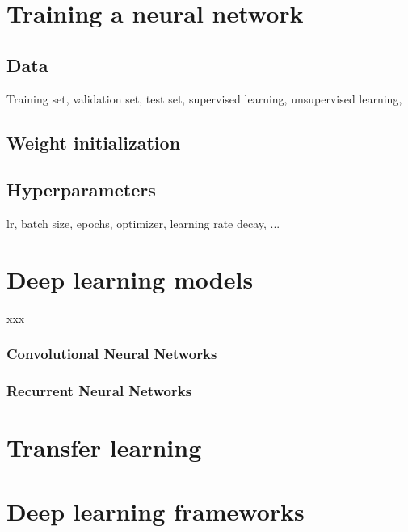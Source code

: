 \section{Training a neural network}

\subsection{Data}
Training set, validation set, test set, supervised learning, unsupervised learning,

\subsection{Weight initialization}

\subsection{Hyperparameters}
lr, batch size, epochs, optimizer, learning rate decay, ...




\section{Deep learning models}
xxx

\subsubsection{Convolutional Neural Networks}


\subsubsection{Recurrent Neural Networks}




\section{Transfer learning}




\section{Deep learning frameworks}